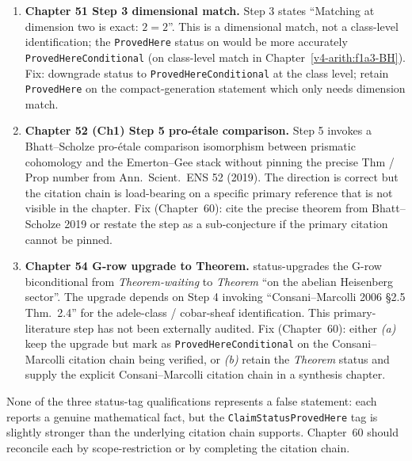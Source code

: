\begin{enumerate}
\item \textbf{Chapter 51 Step 3 dimensional match.}
 Step 3 states
``Matching at dimension two is exact: \(2=2\)''. This is a
dimensional match, not a class-level identification; the
\texttt{ProvedHere} status on
 would be more
accurately \texttt{ProvedHereConditional} (on class-level match in
Chapter~\ref{v4-arith:f1a3-BH}). Fix: downgrade status to
\texttt{ProvedHereConditional} at the class level; retain
\texttt{ProvedHere} on the compact-generation statement which
only needs dimension match.

\item \textbf{Chapter 52 (Ch1) Step 5 pro-\'etale comparison.}
 Step 5 invokes a
Bhatt--Scholze pro-\'etale comparison isomorphism between
prismatic cohomology and the Emerton--Gee stack without pinning
the precise Thm / Prop number from Ann.~Scient.~ENS 52 (2019). The
direction is correct but the citation chain is load-bearing on a
specific primary reference that is not visible in the chapter.
Fix (Chapter~60): cite the precise theorem from Bhatt--Scholze 2019
or restate the step as a sub-conjecture if the primary citation
cannot be pinned.

\item \textbf{Chapter 54 G-row upgrade to Theorem.}
 status-upgrades
the G-row biconditional from \emph{Theorem-waiting} to
\emph{Theorem} ``on the abelian Heisenberg sector''. The upgrade
depends on  Step 4 invoking
``Consani--Marcolli 2006 \S 2.5 Thm.~2.4'' for the adele-class /
cobar-sheaf identification. This primary-literature step has not
been externally audited. Fix (Chapter~60): either
\emph{(a)} keep the upgrade but mark
 as
\texttt{ProvedHereConditional} on the Consani--Marcolli citation
chain being verified, or \emph{(b)} retain the \emph{Theorem}
status and supply the explicit Consani--Marcolli citation chain in
a synthesis chapter.
\end{enumerate}

None of the three status-tag qualifications represents a false
statement: each reports a genuine mathematical fact, but the
\texttt{ClaimStatusProvedHere} tag is slightly stronger than the
underlying citation chain supports. Chapter~60 should reconcile
each by scope-restriction or by completing the citation chain.

